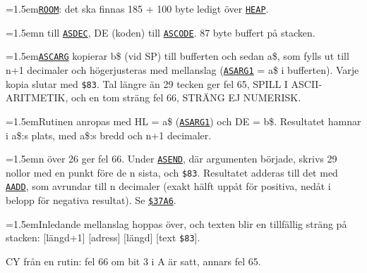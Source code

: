 \begin{Listing}
\begin{Note}
\par\noindent\hangindent=1.5em\hyperlink{l:ROOM}{\texttt{ROOM}}: det ska finnas 185 + 100 byte ledigt över \hyperlink{v:HEAP}{\texttt{HEAP}}.\par
\par\noindent\hangindent=1.5emn till \hyperlink{v:ASDEC}{\texttt{ASDEC}}, DE (koden) till \hyperlink{v:ASCODE}{\texttt{ASCODE}}. 87 byte buffert på stacken.\par
\par\noindent\hangindent=1.5em\hyperlink{l:ASCARG}{\texttt{ASCARG}} kopierar b\$ (vid SP) till bufferten och sedan a\$, som fylls ut till n+1 decimaler och högerjusteras med mellanslag (\hyperlink{v:ASARG1}{\texttt{ASARG1}} = a\$ i bufferten). Varje kopia slutar med \texttt{\$83}. Tal längre än 29 tecken ger fel 65, SPILL I ASCII-ARITMETIK, och en tom sträng fel 66, STRÄNG EJ NUMERISK.\par
\par\noindent\hangindent=1.5emRutinen anropas med HL = a\$ (\hyperlink{v:ASARG1}{\texttt{ASARG1}}) och DE = b\$. Resultatet hamnar i a\$:s plats, med a\$:s bredd och n+1 decimaler.\par
\par\noindent\hangindent=1.5emn över 26 ger fel 66. Under \hyperlink{v:ASEND}{\texttt{ASEND}}, där argumenten började, skrivs 29 nollor med en punkt före de n sista, och \texttt{\$83}. Resultatet adderas till det med \hyperlink{l:AADD}{\texttt{AADD}}, som avrundar till n decimaler (exakt hälft uppåt för positiva, nedåt i belopp för negativa resultat). Se \hyperlink{a:37A6}{\texttt{\$37A6}}.\par
\par\noindent\hangindent=1.5emInledande mellanslag hoppas över, och texten blir en tillfällig sträng på stacken: [längd+1] [adress] [längd] [text \texttt{\$83}].\par
\par\noindent CY från en rutin: fel 66 om bit 3 i A är satt, annars fel 65.\par\end{Note}
\Gap
{}

\end{Listing}
